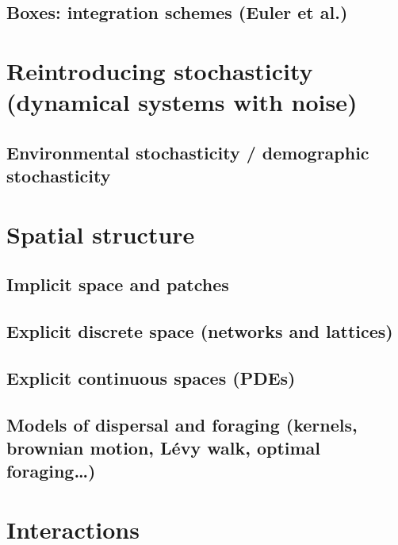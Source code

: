 \documentclass[
]{book}
\theoremstyle{definition}
\theoremstyle{definition}
\theoremstyle{definition}
\theoremstyle{definition}
\theoremstyle{remark}
\begin{document}
\subsection{Boxes: integration schemes (Euler et al.)}\label{boxes-integration-schemes-euler-et-al.}

\section{Reintroducing stochasticity (dynamical systems with noise)}\label{reintroducing-stochasticity-dynamical-systems-with-noise}

\subsection{Environmental stochasticity / demographic stochasticity}\label{environmental-stochasticity-demographic-stochasticity}

\section{Spatial structure}\label{spatial-structure}

\subsection{Implicit space and patches}\label{implicit-space-and-patches}

\subsection{Explicit discrete space (networks and lattices)}\label{explicit-discrete-space-networks-and-lattices}

\subsection{Explicit continuous spaces (PDEs)}\label{explicit-continuous-spaces-pdes}

\subsection{Models of dispersal and foraging (kernels, brownian motion, Lévy walk, optimal foraging\ldots)}\label{models-of-dispersal-and-foraging-kernels-brownian-motion-luxe9vy-walk-optimal-foraging}

\section{Interactions}\label{interactions}
\end{document}
